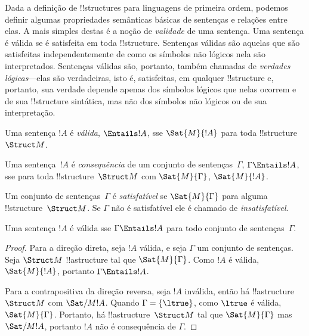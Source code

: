 \documentclass[../../../include/open-logic-section]{subfiles}
\begin{document}

\begin{explain}
Dada a definição de !!{structure}s para linguagens de primeira ordem, podemos
definir algumas propriedades semânticas básicas de sentenças e relações entre
elas. A mais simples destas é a noção de \emph{validade} de
uma sentença. Uma sentença é válida se é satisfeita em toda
!!{structure}. Sentenças válidas são aquelas que são satisfeitas independentemente de
como os símbolos não lógicos nela são interpretados. Sentenças válidas
são, portanto, também chamadas de \emph{verdades lógicas}---elas são verdadeiras, isto é,
satisfeitas, em qualquer !!{structure} e, portanto, sua verdade depende apenas dos
símbolos lógicos que nelas ocorrem e de sua !!{structure} sintática, mas não
dos símbolos não lógicos ou de sua interpretação.
\end{explain}

\begin{defn}[Validade]
Uma sentença $!A$ é \emph{válida}, $\Entails !A$, sse $\Sat{M}{!A}$ para toda
!!{structure}~$\Struct M$.
\end{defn}

\begin{defn}[Consequência]
Uma sentença~$!A$ é \emph{consequência} de um conjunto de sentenças~$\Gamma$, $\Gamma
\Entails !A$, sse para toda !!{structure}~$\Struct M$ com
$\Sat{M}{\Gamma}$, $\Sat{M}{!A}$.
\end{defn}


\begin{defn}[Satisfatibilidade]
Um conjunto de sentenças~$\Gamma$ é \emph{satisfatível} se $\Sat{M}{\Gamma}$
para alguma !!{structure}~$\Struct M$. Se $\Gamma$ não é satisfatível ele é
chamado de \emph{insatisfatível}.
\end{defn}

\begin{prop}
Uma sentença $!A$ é válida sse $\Gamma \Entails !A$ para todo conjunto de
sentenças~$\Gamma$.
\end{prop}

\begin{proof}
Para a direção direta, seja $!A$ válida, e seja $\Gamma$ um
conjunto de sentenças. Seja $\Struct M$ !!a{structure} tal que
$\Sat{M}{\Gamma}$. Como $!A$ é válida, $\Sat{M}{!A}$, portanto $\Gamma
\Entails !A$.

Para a contrapositiva da direção reversa, seja $!A$ inválida,
então há !!a{structure}~$\Struct M$ com $\Sat/{M}{!A}$. Quando $\Gamma
= \{ \ltrue \}$, como $\ltrue$ é válida, $\Sat{M}{\Gamma}$. Portanto,
há !!a{structure}~$\Struct M$ tal que $\Sat{M}{\Gamma}$ mas
$\Sat/{M}{!A}$, portanto $!A$ não é consequência de $\Gamma$.
\end{proof}
\end{document}
